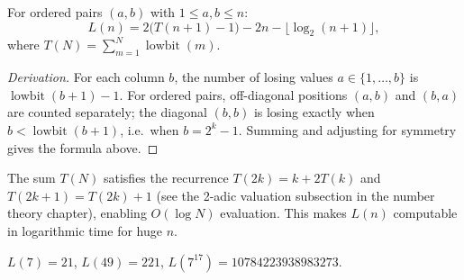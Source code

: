 \begin{theorem}
For ordered pairs $(a,b)$ with $1 \le a,b \le n$:
\[
L(n) = 2\bigl(T(n+1) - 1\bigr) - 2n - \lfloor \log_2(n+1) \rfloor,
\]
where $T(N) = \sum_{m=1}^{N} \operatorname{lowbit}(m)$.
\end{theorem}

\begin{proof}[Derivation]
For each column $b$, the number of losing values $a \in \{1,\ldots,b\}$ is $\operatorname{lowbit}(b+1) - 1$. For ordered pairs, off-diagonal positions $(a,b)$ and $(b,a)$ are counted separately; the diagonal $(b,b)$ is losing exactly when $b < \operatorname{lowbit}(b+1)$, i.e.\ when $b = 2^k - 1$. Summing and adjusting for symmetry gives the formula above.
\end{proof}

\begin{remark}
The sum $T(N)$ satisfies the recurrence $T(2k) = k + 2T(k)$ and $T(2k+1) = T(2k)+1$ (see the 2-adic valuation subsection in the number theory chapter), enabling $O(\log N)$ evaluation. This makes $L(n)$ computable in logarithmic time for huge $n$.
\end{remark}

\begin{example}
$L(7) = 21$, $L(49) = 221$, $L(7^{17}) = 10784223938983273$.
\end{example}
